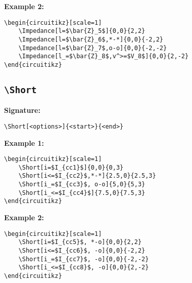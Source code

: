 \documentclass[a4paper,12pt]{article}
\begin{document}
\textbf{Example 2:}

\begin{lstlisting}[style=latexstyle]
\begin{circuitikz}[scale=1]
	\Impedance[l=$\bar{Z}_5$]{0,0}{2,2}
	\Impedance[l=$\bar{Z}_6$,*-*]{0,0}{-2,2}
	\Impedance[l=$\bar{Z}_7$,o-o]{0,0}{-2,-2}
	\Impedance[l_=$\bar{Z}_8$,v^>=$V_8$]{0,0}{2,-2}
\end{circuitikz}
\end{lstlisting}

\begin{center}
\begin{circuitikz}[scale=1]
\end{circuitikz}
\end{center}

\subsection{\texttt{\textbackslash Short}}

\textbf{Signature:}
\begin{verbatim}
\Short[<options>]{<start>}{<end>}
\end{verbatim}

\textbf{Example 1:}

\begin{lstlisting}[style=latexstyle]
\begin{circuitikz}[scale=1]
	\Short[i=$I_{cc1}$]{0,0}{0,3}
	\Short[i<=$I_{cc2}$,*-*]{2.5,0}{2.5,3}
	\Short[i_=$I_{cc3}$, o-o]{5,0}{5,3}
	\Short[i_<=$I_{cc4}$]{7.5,0}{7.5,3}
\end{circuitikz}
\end{lstlisting}


\begin{center}
\begin{circuitikz}[scale=1]
\end{circuitikz}
\end{center}

\textbf{Example 2:}

\begin{lstlisting}[style=latexstyle]
\begin{circuitikz}[scale=1]
	\Short[i=$I_{cc5}$, *-o]{0,0}{2,2}
	\Short[i<=$I_{cc6}$, -o]{0,0}{-2,2}
	\Short[i_=$I_{cc7}$, -o]{0,0}{-2,-2}
	\Short[i_<=$I_{cc8}$, -o]{0,0}{2,-2}
\end{circuitikz}
\end{lstlisting}
\end{document}

